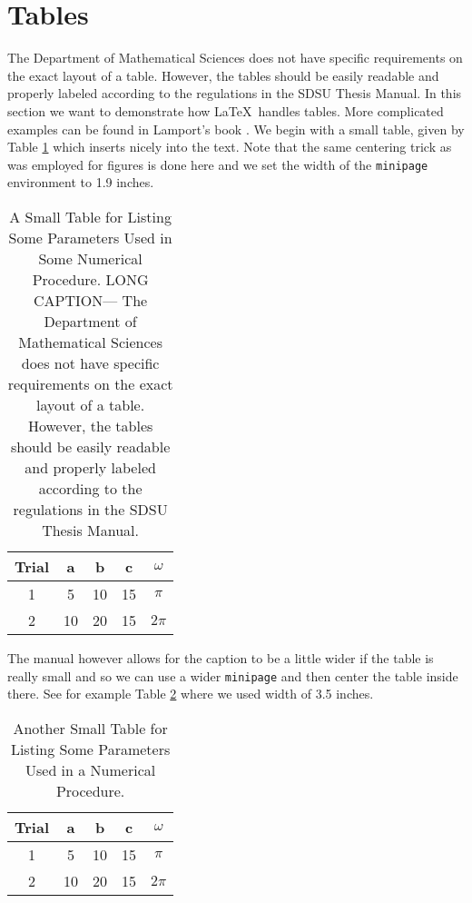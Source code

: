 % 
% 


\section{Tables}

The Department of Mathematical Sciences does not have specific
requirements on the exact layout of a table. However, the tables
should be easily readable and properly labeled according to the
regulations in the SDSU Thesis Manual. In this section we want to
demonstrate how \LaTeX\ handles tables. More complicated examples can
be found in Lamport's book \cite{LAM,LAM2}. We begin with a small table,
given by Table \ref{tab1} which inserts nicely into the text.  Note
that the same centering trick as was employed for figures is done here
and we set the width of the \texttt{minipage} environment to 1.9
inches.
% 

\begin{table}[hbt]
  \centering
  \begin{minipage}{1.9in}
    \caption{A Small Table for Listing Some Parameters Used in Some
      Numerical Procedure\label{tab1}. LONG CAPTION--- The Department
      of Mathematical Sciences does not have specific requirements on
      the exact layout of a table. However, the tables should be
      easily readable and properly labeled according to the
      regulations in the SDSU Thesis Manual.}
    \begin{tabular}{|c||c|c|c|c||}    \hline
      Trial &	a  &  b & c & $\omega$ \\ \hline \hline
      1 & 5 & 10  & 15 & $\pi$ \\ \hline
      2 & 10 & 20  & 15 & $2\pi$ \\ \hline
    \end{tabular}
  \end{minipage}
\end{table}
% 

The manual however
allows for the caption to be a little wider if the table is really
small and so we can use a wider \texttt{minipage} and then center the
table inside there.  See for example Table \ref{wtab} where we used
width of 3.5 inches.
% 
\begin{table}[hbt]
  \centering
  \begin{minipage}{3.5in}
    \centering
    \caption{Another Small Table for Listing Some Parameters Used in a
      Numerical Procedure\label{wtab}.}
    \begin{tabular}{|c||c|c|c|c||}    \hline
      Trial &	a  &  b & c & $\omega$ \\ \hline \hline
      1 & 5 & 10  & 15 & $\pi$ \\ \hline
      2 & 10 & 20  & 15 & $2\pi$ \\ \hline
    \end{tabular}
  \end{minipage}
\end{table}

